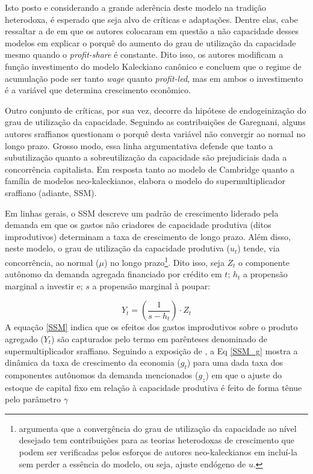 Isto posto e considerando a grande aderência deste modelo na tradição heterodoxa,  é esperado que seja alvo de críticas e adaptações. Dentre elas, cabe ressaltar a de \textcite{bhaduri_unemployment_1990} em que os autores colocaram em questão a não capacidade desses modelos em explicar o porquê do aumento do grau de utilização da capacidade mesmo quando o \textit{profit-share} é constante. Dito isso, os autores modificam a função investimento do modelo Kaleckiano canônico e concluem que o regime de acumulação pode ser tanto \textit{wage} quanto \textit{profit-led}, mas em ambos o investimento é a variável que determina crescimento econômico. 


Outro conjunto de críticas, por sua vez, decorre da hipótese de endogeinização do grau de utilização da capacidade. Seguindo as contribuições de Garegnani, alguns autores sraffianos questionam o porquê desta variável não convergir ao normal no longo prazo. Grosso modo, essa linha argumentativa defende que tanto a subutilização quanto a sobreutilização da capacidade são prejudiciais dada a concorrência capitalista. Em resposta tanto ao modelo de Cambridge quanto a família de modelos neo-kaleckianos, \textcite{serrano_sraffian_1995} elabora o modelo do supermultiplicador sraffiano  (adiante, SSM).

Em linhas gerais, o SSM descreve um padrão de crescimento liderado pela demanda em que os gastos não criadores de capacidade produtiva (ditos improdutivos) determinam a taxa de crescimento de longo prazo. Além disso, neste modelo, o grau de utilização da capacidade produtiva ($u_t$) tende, via concorrência, ao normal ($\mu$) no longo prazo\footnote{\textcite{nikiforos_comments_2018} argumenta que a convergência do grau de utilização da capacidade ao nível desejado tem contribuições para as teorias heterodoxas de crescimento que podem ser verificadas pelos esforços de autores neo-kaleckianos em incluí-la sem perder a essência do modelo, ou seja, ajuste endógeno de $u$.}.
Dito isso, seja $Z_t$ o componente autônomo da demanda agregada financiado por crédito em $t$; $h_t$ a propensão marginal a investir e; $s$ a propensão marginal à poupar:

\begin{equation}
Y_t = \left( \frac{1}{s-h_t} \right)\cdot Z_t
\label{SSM}
\end{equation}
A equação \ref{SSM} indica que os efeitos dos gastos improdutivos sobre o produto agregado ($Y_t$) são capturados pelo termo em parênteses denominado de supermultiplicador sraffiano. Seguindo a exposição de \textcite{serrano_sraffian_2017}, a Eq \ref{SSM_g} mostra a dinâmica da taxa de crescimento da economia ($g_t$) para uma dada taxa dos componentes autônomos da demanda mencionados ($g_z$) em que o ajuste do estoque de capital fixo em relação à capacidade produtiva é feito de forma tênue pelo parâmetro $\gamma$

